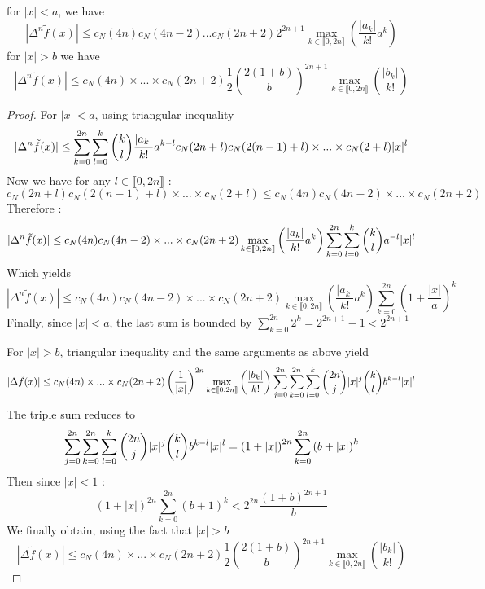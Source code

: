 \documentclass[11pt,a4paper]{article}
\begin{document}
\begin{Lem} for $|x| < a$, we have
\begin{equation}
|\Delta^n \tilde{f}(x)| \leq c_N(4n)c_N(4n-2)...c_N(2n+2)2^{2n+1}\max_{k\in\llbracket 0,2n\rrbracket}\left(\dfrac{|a_k|}{k!}a^k\right)
\label{bigBadEq1}
\end{equation}
for $|x| > b$ we have 
\begin{equation}
|\Delta^n \tilde{f}(x)| \leq c_N(4n)\times...\times c_N(2n+2)\frac{1}{2}\left(\dfrac{2(1+b)}{b}\right)^{2n+1}\max_{k\in\llbracket 0,2n\rrbracket}\left(\dfrac{|b_k|}{k!}\right) 
\label{bigBadEq2}
\end{equation}
\begin{proof}For $|x|<a$, using triangular inequality
\[|\Delta^n \tilde{f}(x)| \leq \sum_{k=0}^{2n}\sum_{l=0}^k \dbinom{k}{l}\dfrac{|a_k|}{k!}a^{k-l}c_N(2n+l)c_N(2(n-1)+l)\times ... \times c_N(2+l)|x|^l\]
Now we have for any $l\in\llbracket 0,2n\rrbracket$ : \[c_N(2n+l)c_N(2(n-1)+l)\times ... \times c_N(2+l) \leq c_N(4n)c_N(4n-2) \times ... \times c_N(2n+2)\]
Therefore : 
\[|\Delta^n \tilde{f}(x)| \leq c_N(4n)c_N(4n-2) \times ... \times c_N(2n+2)\max_{k\in\llbracket 0,2n\rrbracket}\left(\dfrac{|a_k|}{k!}a^k\right)\sum_{k=0}^{2n}\sum_{l=0}^k \dbinom{k}{l}a^{-l}|x|^l\]
Which yields
\[|\Delta^n \tilde{f}(x)| \leq c_N(4n)c_N(4n-2) \times ... \times c_N(2n+2)\max_{k\in\llbracket 0,2n\rrbracket}\left(\dfrac{|a_k|}{k!}a^k\right)\sum_{k=0}^{2n}\left(1+\frac{|x|}{a}\right)^k\]
Finally, since $|x|<a$, the last sum is bounded by $\displaystyle\sum_{k=0}^{2n}2^k = 2^{2n+1}-1 < 2^{2n+1}$

For $|x| > b$, triangular inequality and the same arguments as above yield \[|\Delta \tilde{f}(x)| \leq c_N(4n)\times...\times c_N(2n+2)\left(\frac{1}{|x|}\right)^{2n}\max_{k\in\llbracket 0,2n\rrbracket}\left(\dfrac{|b_k|}{k!}\right) \sum_{j=0}^{2n}\sum_{k=0}^{2n}\sum_{l=0}^{k}\dbinom{2n}{j}|x|^j\dbinom{k}{l} b^{k-l}|x|^l\]
The triple sum reduces to 
\[\sum_{j=0}^{2n}\sum_{k=0}^{2n}\sum_{l=0}^{k}\dbinom{2n}{j}|x|^j\dbinom{k}{l} b^{k-l}|x|^l = \left(1+|x|\right)^{2n} \sum_{k=0}^{2n}\left(b + |x|\right)^k\]
Then since $|x|<1$ :
\[\left(1+|x|\right)^{2n} \sum_{k=0}^{2n}\left(b + 1\right)^k < 2^{2n}\frac{\left(1+b\right)^{2n+1}}{b}\]
We finally obtain, using the fact that $|x|>b$
\[|\Delta \tilde{f}(x)| \leq c_N(4n)\times...\times c_N(2n+2)\frac{1}{2}\left(\dfrac{2(1+b)}{b}\right)^{2n+1}\max_{k\in\llbracket 0,2n\rrbracket}\left(\dfrac{|b_k|}{k!}\right) \]
\end{proof}
\end{Lem} 
\end{document}
